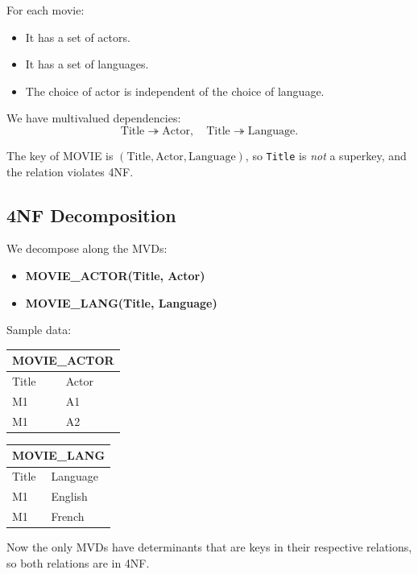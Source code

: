 \documentclass{article}
\begin{document}
For each movie:
\begin{itemize}
  \item It has a set of actors.
  \item It has a set of languages.
  \item The choice of actor is independent of the choice of language.
\end{itemize}

We have multivalued dependencies:
\[
\text{Title} \twoheadrightarrow \text{Actor},\quad
\text{Title} \twoheadrightarrow \text{Language}.
\]

The key of MOVIE is $(\text{Title}, \text{Actor}, \text{Language})$,
so \texttt{Title} is \emph{not} a superkey, and the relation violates 4NF.

\subsection*{4NF Decomposition}

We decompose along the MVDs:

\begin{itemize}
  \item \textbf{MOVIE\_ACTOR(Title, Actor)}
  \item \textbf{MOVIE\_LANG(Title, Language)}
\end{itemize}

Sample data:

\begin{center}
\begin{tabular}{ll}
\toprule
\multicolumn{2}{c}{\textbf{MOVIE\_ACTOR}} \\
\midrule
Title & Actor \\
\midrule
M1 & A1 \\
M1 & A2 \\
\bottomrule
\end{tabular}
\hspace{2em}
\begin{tabular}{ll}
\toprule
\multicolumn{2}{c}{\textbf{MOVIE\_LANG}} \\
\midrule
Title & Language \\
\midrule
M1 & English \\
M1 & French \\
\bottomrule
\end{tabular}
\end{center}

Now the only MVDs have determinants that are keys in their respective
relations, so both relations are in 4NF.
\end{document}
